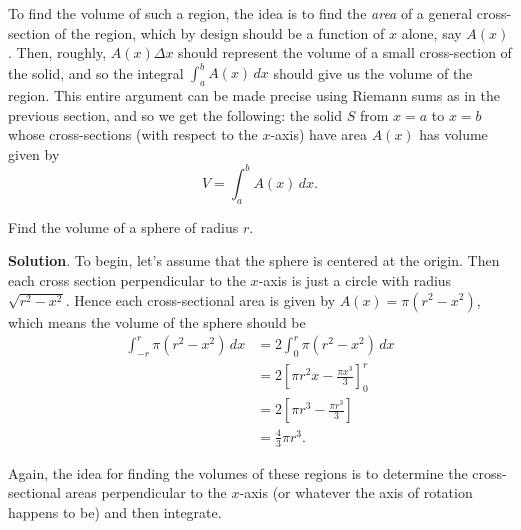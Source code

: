 \documentclass[10pt,]{book}
\theoremstyle{ptxplainnotitle}
\theoremstyle{ptxplaintitle}
\theoremstyle{ptxplainnotitle}
\theoremstyle{ptxplaintitle}
\theoremstyle{ptxplainnotitle}
\theoremstyle{ptxplaintitle}
\theoremstyle{ptxdefinitionnotitle}
\theoremstyle{ptxdefinitiontitle}
\theoremstyle{ptxdefinitionnotitle}
\theoremstyle{ptxdefinitiontitle}
\theoremstyle{ptxdefinitionnotitle}
\theoremstyle{ptxdefinitiontitle}
\theoremstyle{ptxdefinitionnotitle}
\theoremstyle{ptxdefinitiontitle}
\theoremstyle{ptxdefinitionnotitle}
\theoremstyle{ptxdefinitiontitle}
\numberwithin{equation}{section}
\newcommand{\amp}{&}
\begin{document}
\hypertarget{p-629}{}%
To find the volume of such a region, the idea is to find the \emph{area} of a general cross-section of the region, which by design should be a function of \(x\) alone, say \(A(x)\). Then, roughly, \(A(x)\Delta x\) should represent the volume of a small cross-section of the solid, and so the integral \(\int_{a}^{b}A(x)\,dx\) should give us the volume of the region. This entire argument can be made precise using Riemann sums as in the previous section, and so we get the following: the solid \(S\) from \(x = a\) to \(x = b\) whose cross-sections (with respect to the \(x\)-axis) have area \(A(x)\) has volume given by%
\begin{equation}
V = \int_{a}^{b}A(x)\,dx.\label{equation-solid-revolution-volume}
\end{equation}
%
\begin{example}\label{example-finding-the-volume-of-a-sphere}
\hypertarget{p-630}{}%
Find the volume of a sphere of radius \(r\).%
\par\smallskip%
\noindent\textbf{Solution}.\hypertarget{solution-137}{}\quad%
\hypertarget{p-631}{}%
To begin, let's assume that the sphere is centered at the origin. Then each cross section perpendicular to the \(x\)-axis is just a circle with radius \(\sqrt{r^{2} - x^{2}}\). Hence each cross-sectional area is given by \(A(x) = \pi(r^{2} - x^{2})\), which means the volume of the sphere should be%
\begin{align*}
\int_{-r}^{r}\pi(r^{2} - x^{2})\,dx \amp= 2\int_{0}^{r}\pi(r^{2} - x^{2})\,dx\\
\amp= 2\left[\pi r^{2}x - \frac{\pi x^{3}}{3}\right]_{0}^{r}\\
\amp= 2\left[\pi r^{3} - \frac{\pi r^{3}}{3}\right]\\
\amp= \frac{4}{3}\pi r^{3}.
\end{align*}
%
\end{example}
\hypertarget{p-632}{}%
Again, the idea for finding the volumes of these regions is to determine the cross-sectional areas perpendicular to the \(x\)-axis (or whatever the axis of rotation happens to be) and then integrate.%
\end{document}
